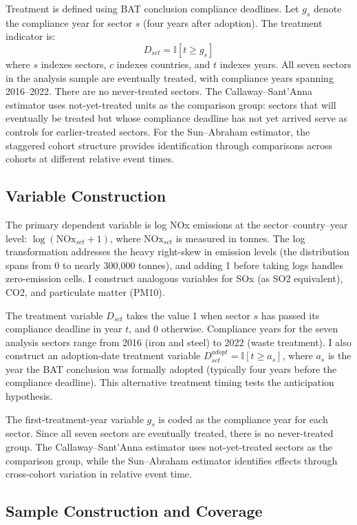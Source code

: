 \documentclass[12pt]{article}
\newcommand{\ind}{\mathbb{I}}
\begin{document}
Treatment is defined using BAT conclusion compliance deadlines. Let $g_s$ denote the compliance year for sector $s$ (four years after adoption). The treatment indicator is:
\[
D_{sct} = \ind[t \geq g_s]
\]
where $s$ indexes sectors, $c$ indexes countries, and $t$ indexes years. All seven sectors in the analysis sample are eventually treated, with compliance years spanning 2016--2022. There are no never-treated sectors. The Callaway--Sant'Anna estimator uses not-yet-treated units as the comparison group: sectors that will eventually be treated but whose compliance deadline has not yet arrived serve as controls for earlier-treated sectors. For the Sun--Abraham estimator, the staggered cohort structure provides identification through comparisons across cohorts at different relative event times.

\subsection{Variable Construction}

The primary dependent variable is log NOx emissions at the sector--country--year level: $\log(\text{NOx}_{sct} + 1)$, where $\text{NOx}_{sct}$ is measured in tonnes. The log transformation addresses the heavy right-skew in emission levels (the distribution spans from 0 to nearly 300,000 tonnes), and adding 1 before taking logs handles zero-emission cells. I construct analogous variables for SOx (as SO2 equivalent), CO2, and particulate matter (PM10).

The treatment variable $D_{sct}$ takes the value 1 when sector $s$ has passed its compliance deadline in year $t$, and 0 otherwise. Compliance years for the seven analysis sectors range from 2016 (iron and steel) to 2022 (waste treatment). I also construct an adoption-date treatment variable $D^{adopt}_{sct} = \ind[t \geq a_s]$, where $a_s$ is the year the BAT conclusion was formally adopted (typically four years before the compliance deadline). This alternative treatment timing tests the anticipation hypothesis.

The first-treatment-year variable $g_s$ is coded as the compliance year for each sector. Since all seven sectors are eventually treated, there is no never-treated group. The Callaway--Sant'Anna estimator uses not-yet-treated sectors as the comparison group, while the Sun--Abraham estimator identifies effects through cross-cohort variation in relative event time.

\subsection{Sample Construction and Coverage}
\end{document}
